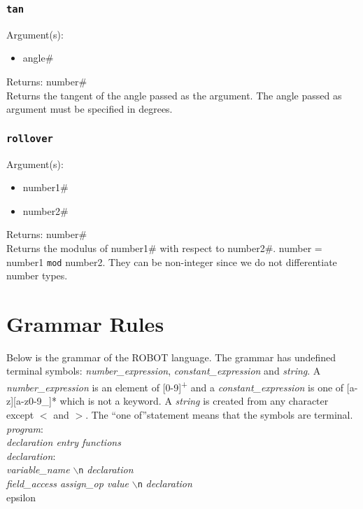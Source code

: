 \documentclass[a4paper]{article}
\newcommand{\og}{``}
\newcommand{\fg}{''}
\begin{document}
\subsubsection{\texttt{tan}}

Argument(s):
\begin{itemize}
	\item angle\#
\end{itemize}

\noindent Returns: number\#\\

Returns the tangent of the angle passed as the argument.  The angle passed as argument must be specified in degrees.

\subsubsection{\texttt{rollover}}

Argument(s):
\begin{itemize}
	\item number1\#
	\item number2\#
\end{itemize}

\noindent Returns: number\#\\

Returns the modulus of number1\# with respect to number2\#. number = number1 \texttt{mod} number2. They can be non-integer since we do not differentiate number types.

\section{Grammar Rules}

Below is the grammar of the ROBOT language. The grammar has undefined terminal symbols: \textit{number\_expression}, \textit{constant\_expression} and \textit{string}. A \textit{number\_expression} is an element of [0-9]\textsuperscript{+} and a \textit{constant\_expression} is one of [a-z][a-z0-9\_]* which is not a keyword. A \textit{string} is created from any character except $<$ and $>$.
The \og one of\fg statement means that the symbols are terminal.\\

\noindent\textit{program}:\\
\indent\textit{declaration entry functions}\\

\noindent\textit{declaration}:\\
\indent\textit{variable\_name} \texttt{$\backslash$n} \textit{declaration}\\
\indent\textit{field\_access assign\_op value} \texttt{$\backslash$n} \textit{declaration}\\
\indent epsilon\\
\end{document}
